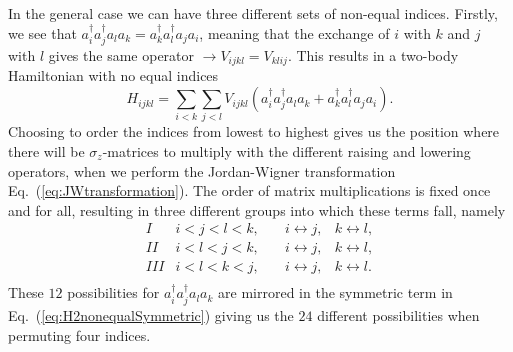 In the general case we can have three different sets of non-equal
indices. Firstly, we see that $a^\dag_i a^\dag_j a_l a_k = a^\dag_k
a^\dag_l a_j a_i$, meaning that the  exchange of $i$ with $k$ and $j$ with $l$
gives the same operator $\rightarrow V_{ijkl}=V_{klij}$. This results in 
a two-body Hamiltonian with no equal indices
\begin{equation}
\label{eq:H2nonequalSymmetric}
H_{ijkl} = 
\sum_{i < k}\sum_{ j < l} V_{ijkl} (a_i^\dag a_j^\dag a_l a_k + a_k^\dag
a_l^\dag a_j a_i).
\end{equation} 
Choosing to order the 
indices from lowest to highest gives us  the position 
where there will be $\sigma_z$-matrices to multiply with the
different raising and lowering operators, when we perform the
Jordan-Wigner transformation Eq.~(\ref{eq:JWtransformation}). The
order of matrix 
multiplications is fixed once and for all, resulting in  three
different groups into which these terms fall, namely
\begin{equation}
\label{eq:threeGroups}
\begin{array}{ccccc}
I & i<j<l<k, & i \leftrightarrow j, &  k\leftrightarrow l, \\
II & i<l<j<k, \quad& i \leftrightarrow j, &  k\leftrightarrow l, \\
III & i<l<k<j, \quad& i \leftrightarrow j, &  k\leftrightarrow l. \\
\end{array} 
\end{equation}
These $12$ possibilities for $a^\dag_i a^\dag_j a_l a_k$ 
are mirrored in the symmetric term
in Eq.~(\ref{eq:H2nonequalSymmetric}) giving us the $24$ different
possibilities when permuting four indices.

